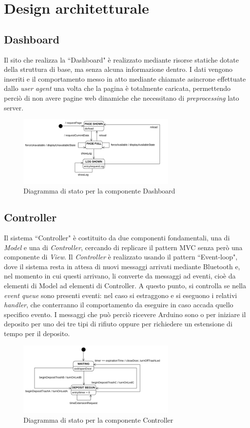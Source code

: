 \documentclass[a4paper, 12pt]{report}
\begin{document}
		\section{Design architetturale}
			\subsection{Dashboard}
			Il sito che realizza la ``Dashboard" è realizzato mediante risorse statiche dotate
			della struttura di base, ma senza alcuna informazione dentro. I dati vengono inseriti e il
			comportamento messo in atto mediante chiamate asincrone effettuate dallo \textit{user agent}
			una volta che la pagina è totalmente caricata, permettendo perciò di non avere pagine web
			dinamiche che necessitano di \textit{preprocessing} lato server.
			\begin{figure}[H]
				\centering
				\includegraphics[width=0.7\textwidth]{"img/DashboardStatechart"}    
				\caption{Diagramma di stato per la componente Dashboard}
			\end{figure}
			\subsection{Controller}
			Il sistema ``Controller" è costituito da due componenti fondamentali, una di \textit{Model}
			e una di \textit{Controller}, cercando di replicare il pattern MVC senza però una componente
			di \textit{View}. Il \textit{Controller} è realizzato usando il pattern ``Event-loop", dove il
			sistema resta in attesa di nuovi messaggi arrivati mediante Bluetooth e, nel momento in cui
			questi arrivano, li converte da messaggi ad eventi, cioè da elementi di Model ad
			elementi di Controller. A questo punto, si controlla se nella \textit{event queue} sono
			presenti eventi: nel caso si estraggono e si eseguono i relativi \textit{handler}, che
			conterranno il comportamento da eseguire in caso accada quello specifico evento. I
			messaggi che può perciò ricevere Arduino sono o per iniziare il deposito per uno dei tre
			tipi di rifiuto oppure per richiedere un estensione di tempo per il deposito.
			\begin{figure}[H]
				\centering
				\includegraphics[width=0.7\textwidth]{"img/ControllerStatechart"}    
				\caption{Diagramma di stato per la componente Controller}
			\end{figure}
\end{document}

